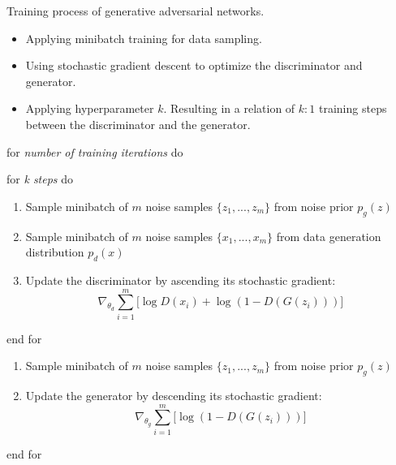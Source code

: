 
\caption{ Training process of generative adversarial networks.}
 \label{gan_algorithm_1}
\begin{itemize}
  \item Applying minibatch training for data sampling.
  \item Using stochastic gradient descent to optimize the discriminator and generator.
  \item Applying hyperparameter \( k \). Resulting in a relation  of \( k:1 \) training steps between the discriminator and the generator.
\end{itemize}
\hrulefill

\begin{description} \item
for \textit{ number of training iterations } do

  \begin{description}
  \item for \textit{ k steps } do

    \begin{enumerate}

    \item Sample minibatch of \( m \) noise samples \( \{z_1, ... ,z_m \} \) from noise prior \( p_g(z) \)
    \item Sample minibatch of \( m \) noise samples \( \{x_1, ... ,x_m \} \) from data generation distribution \( p_d(x) \)
    \item Update the discriminator by ascending its stochastic gradient:
    \[
      \nabla_{\theta_d} \sum_{i=1}^m \big[\log D(x_i) + \log ( 1 - D(G(z_i)) ) \big]
    \]

    \end{enumerate}

  \item end for
  \end{description}

  \begin{enumerate}

    \item Sample minibatch of \( m \) noise samples \( \{z_1, ... ,z_m \} \) from noise prior \( p_g(z) \)
    \item Update the generator by descending its stochastic gradient:
    \[
      \nabla_{\theta_g} \sum_{i=1}^m \big[\log ( 1 - D(G(z_i)) ) \big]
    \]

  \end{enumerate}

\item end for
\end{description}
